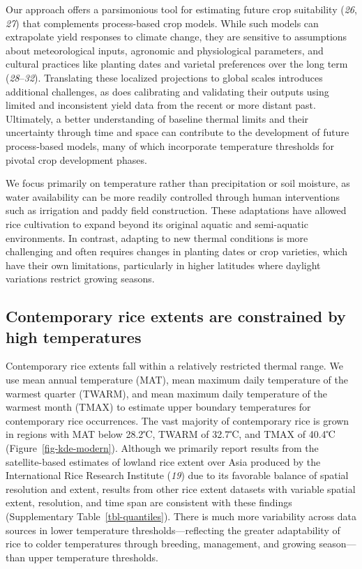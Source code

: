\documentclass[
  letterpaper,
  DIV=11,
  numbers=noendperiod]{scrartcl}
\begin{document}
Our approach offers a parsimonious tool for estimating future crop
suitability (\emph{26}, \emph{27}) that complements process-based crop
models. While such models can extrapolate yield responses to climate
change, they are sensitive to assumptions about meteorological inputs,
agronomic and physiological parameters, and cultural practices like
planting dates and varietal preferences over the long term
(\emph{28}--\emph{32}). Translating these localized projections to
global scales introduces additional challenges, as does calibrating and
validating their outputs using limited and inconsistent yield data from
the recent or more distant past. Ultimately, a better understanding of
baseline thermal limits and their uncertainty through time and space can
contribute to the development of future process-based models, many of
which incorporate temperature thresholds for pivotal crop development
phases.

We focus primarily on temperature rather than precipitation or soil
moisture, as water availability can be more readily controlled through
human interventions such as irrigation and paddy field construction.
These adaptations have allowed rice cultivation to expand beyond its
original aquatic and semi-aquatic environments. In contrast, adapting to
new thermal conditions is more challenging and often requires changes in
planting dates or crop varieties, which have their own limitations,
particularly in higher latitudes where daylight variations restrict
growing seasons.

\subsection{Contemporary rice extents are constrained by high
temperatures}\label{contemporary-rice-extents-are-constrained-by-high-temperatures}

Contemporary rice extents fall within a relatively restricted thermal
range. We use mean annual temperature (MAT), mean maximum daily
temperature of the warmest quarter (TWARM), and mean maximum daily
temperature of the warmest month (TMAX) to estimate upper boundary
temperatures for contemporary rice occurrences. The vast majority of
contemporary rice is grown in regions with MAT below 28.2℃, TWARM of
32.7℃, and TMAX of 40.4℃ (Figure~\ref{fig-kde-modern}). Although we
primarily report results from the satellite-based estimates of lowland
rice extent over Asia produced by the International Rice Research
Institute (\emph{19}) due to its favorable balance of spatial resolution
and extent, results from other rice extent datasets with variable
spatial extent, resolution, and time span are consistent with these
findings (Supplementary Table~\ref{tbl-quantiles}). There is much more
variability across data sources in lower temperature
thresholds---reflecting the greater adaptability of rice to colder
temperatures through breeding, management, and growing season---than
upper temperature thresholds.
\end{document}
